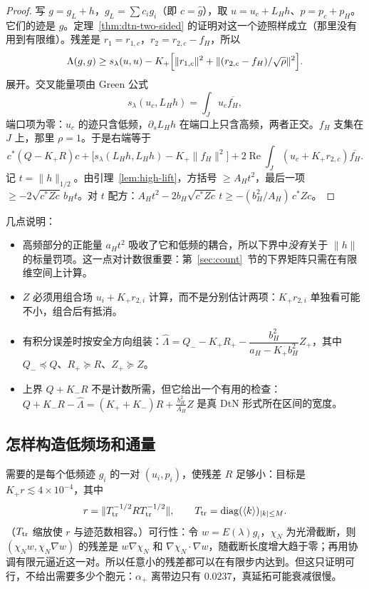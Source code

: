 \documentclass[11pt,a4paper,fontset=fandol]{ctexart}
\begin{document}
\begin{proof}
写 $g=g_L+h$，$g_L=\sum c_ig_i$（即 $c=\hat g$），取 $u=u_c+L_Hh$、$p=p_c+p_H$。它们的迹是 $g$。定理~\ref{thm:dtn-two-sided} 的证明对这一个迹照样成立（那里没有用到有限维）。残差是 $r_1=r_{1,c}$，$r_2=r_{2,c}-f_H$，所以
\[
\Lambda(g,g)\ge s_\lambda(u,u)-K_+\Bigl[\|r_{1,c}\|^2+\|(r_{2,c}-f_H)/\sqrt\rho\|^2\Bigr].
\]
展开。交叉能量项由 Green 公式
\[
s_\lambda(u_c,L_Hh)=\int_Ju_c\overline{f_H},
\]
端口项为零：$u_c$ 的迹只含低频，$\partial_sL_Hh$ 在端口上只含高频，两者正交。$f_H$ 支集在 $J$ 上，那里 $\rho=1$。于是右端等于
\[
c^*(Q-K_+R)c+\bigl[s_\lambda(L_Hh,L_Hh)-K_+\|f_H\|^2\bigr]+2\operatorname{Re}\int_J(u_c+K_+r_{2,c})\overline{f_H}.
\]
记 $t=\|h\|_{1/2}$。由引理~\ref{lem:high-lift}，方括号 $\ge A_Ht^2$，最后一项 $\ge-2\sqrt{c^*Zc}\,b_Ht$。对 $t$ 配方：$A_Ht^2-2b_H\sqrt{c^*Zc}\,t\ge-(b_H^2/A_H)\,c^*Zc$。
\end{proof}

几点说明：
\begin{itemize}
\item 高频部分的正能量 $a_Ht^2$ 吸收了它和低频的耦合，所以下界中\emph{没有}关于 $\|h\|$ 的标量罚项。这一点对计数很重要：第~\ref{sec:count}~节的下界矩阵只需在有限维空间上计算。
\item $Z$ 必须用组合场 $u_i+K_+r_{2,i}$ 计算，而不是分别估计两项：$K_+r_{2,i}$ 单独看可能不小，组合后有抵消。
\item 有积分误差时按安全方向组装：$\hat\Lambda=Q_--K_+R_+-\dfrac{b_H^2}{a_H-K_+b_H^2}Z_+$，其中 $Q_-\preceq Q$、$R_+\succeq R$、$Z_+\succeq Z$。
\item 上界 $Q+K_-R$ 不是计数所需，但它给出一个有用的检查：$Q+K_-R-\hat\Lambda=(K_++K_-)R+\frac{b_H^2}{A_H}Z$ 是真 DtN 形式所在区间的宽度。
\end{itemize}

\subsection{怎样构造低频场和通量}

需要的是每个低频迹 $g_i$ 的一对 $(u_i,p_i)$，使残差 $R$ 足够小：目标是 $K_+r\lesssim4\times10^{-4}$，其中
\[
r=\|T_{\rm tr}^{-1/2}RT_{\rm tr}^{-1/2}\|,\qquad T_{\rm tr}=\operatorname{diag}(\langle k\rangle)_{|k|\le M}.
\]
（$T_{\rm tr}$ 缩放使 $r$ 与迹范数相容。）可行性：令 $w=E(\lambda)g_i$，$\chi_N$ 为光滑截断，则 $(\chi_Nw,\chi_N\nabla w)$ 的残差是 $w\nabla\chi_N$ 和 $\nabla\chi_N\cdot\nabla w$，随截断长度增大趋于零；再用协调有限元逼近这一对。所以任意小的残差都可以在有限步内达到。但这只证明可行，不给出需要多少个胞元：$\alpha_+$ 离带边只有 $0.0237$，真延拓可能衰减很慢。
\end{document}
